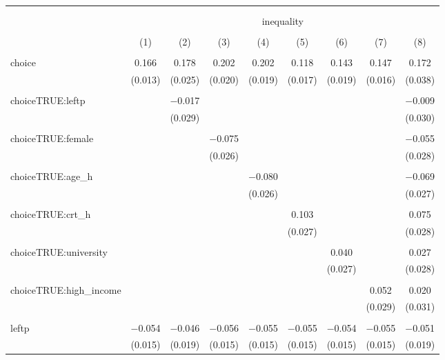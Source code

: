 
\begin{table}[!htbp] \centering 
  \caption{} 
  \label{} 
\begin{tabular}{@{\extracolsep{5pt}}lcccccccc} 
\\[-1.8ex]\hline 
\hline \\[-1.8ex] 
\\[-1.8ex] & \multicolumn{8}{c}{inequality} \\ 
\\[-1.8ex] & (1) & (2) & (3) & (4) & (5) & (6) & (7) & (8)\\ 
\hline \\[-1.8ex] 
 choice & 0.166 & 0.178 & 0.202 & 0.202 & 0.118 & 0.143 & 0.147 & 0.172 \\ 
  & (0.013) & (0.025) & (0.020) & (0.019) & (0.017) & (0.019) & (0.016) & (0.038) \\ 
  & & & & & & & & \\ 
 choiceTRUE:leftp &  & $-$0.017 &  &  &  &  &  & $-$0.009 \\ 
  &  & (0.029) &  &  &  &  &  & (0.030) \\ 
  & & & & & & & & \\ 
 choiceTRUE:female &  &  & $-$0.075 &  &  &  &  & $-$0.055 \\ 
  &  &  & (0.026) &  &  &  &  & (0.028) \\ 
  & & & & & & & & \\ 
 choiceTRUE:age\_h &  &  &  & $-$0.080 &  &  &  & $-$0.069 \\ 
  &  &  &  & (0.026) &  &  &  & (0.027) \\ 
  & & & & & & & & \\ 
 choiceTRUE:crt\_h &  &  &  &  & 0.103 &  &  & 0.075 \\ 
  &  &  &  &  & (0.027) &  &  & (0.028) \\ 
  & & & & & & & & \\ 
 choiceTRUE:university &  &  &  &  &  & 0.040 &  & 0.027 \\ 
  &  &  &  &  &  & (0.027) &  & (0.028) \\ 
  & & & & & & & & \\ 
 choiceTRUE:high\_income &  &  &  &  &  &  & 0.052 & 0.020 \\ 
  &  &  &  &  &  &  & (0.029) & (0.031) \\ 
  & & & & & & & & \\ 
 leftp & $-$0.054 & $-$0.046 & $-$0.056 & $-$0.055 & $-$0.055 & $-$0.054 & $-$0.055 & $-$0.051 \\ 
  & (0.015) & (0.019) & (0.015) & (0.015) & (0.015) & (0.015) & (0.015) & (0.019) \\ 

\end{tabular}
\end{table}
